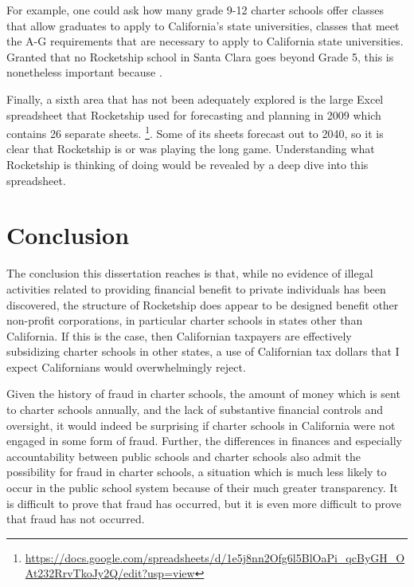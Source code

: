 For example, one could ask how many grade 9-12 charter schools offer classes that allow graduates to apply to California's state universities, classes that meet the A-G requirements that are necessary to apply to California state universities. Granted that no Rocketship school in Santa Clara goes beyond Grade 5, this is nonetheless important because . 

Finally, a sixth area that has not been adequately explored is the large Excel spreadsheet that Rocketship used for forecasting and planning in 2009 which contains 26 separate sheets. \footnote{\url{https://docs.google.com/spreadsheets/d/1e5j8nn2Ofg6l5BlOaPi_qcByGH_OAt232RrvTkoJy2Q/edit?usp=view}}. Some of its sheets forecast out to 2040, so it is clear that Rocketship is or was playing the long game. Understanding what Rocketship is thinking of doing would be revealed by a deep dive into this spreadsheet.

\newpage
\section{Conclusion}%
\label{sec:conclusion}\indent%

The conclusion this dissertation reaches is that, while no evidence of illegal activities related to providing financial benefit to private individuals has been discovered, the structure of Rocketship does appear to be designed benefit other non-profit corporations, in particular charter schools in states other than California. If this is the case, then Californian taxpayers are effectively subsidizing charter schools in other states, a use of Californian tax dollars that I expect Californians would overwhelmingly reject.

Given the history of fraud in charter schools, the amount of money which is sent to charter schools annually, and the lack of substantive financial controls and oversight, it would indeed be surprising if charter schools in California were not engaged in some form of fraud. Further, the differences in finances and especially accountability between public schools and charter schools also admit the possibility for fraud in charter schools, a situation which is much less likely to occur in the public school system because of their much greater transparency. It is difficult to prove that fraud has occurred, but it is even more difficult to prove that fraud has not occurred. 

